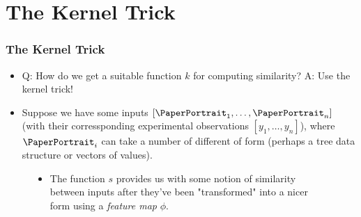 \documentclass[9pt,hyperref={pdfpagelabels=false},xcolor=table]{beamer}
\begin{document}
\section{The Kernel Trick}

\begin{frame}
    \frametitle{The Kernel Trick}
    \begin{itemize}
        \item Q: How do we get a suitable function $k$ for computing similarity? A: Use the kernel trick!
        \item Suppose we have some inputs $\left[ \text{\PaperPortrait}_1 , \ldots , \text{\PaperPortrait}_n \right]$ (with their corressponding experimental observations $\left[ y_1 , \ldots , y_n \right]$), where $\text{\PaperPortrait}_i$ can take a number of different of form (perhaps a tree data structure or vectors of values).
    \end{itemize}
    \begin{figure}[h]
        \centering
        \begin{itemize}
            \item The function $s$ provides us with some notion of similarity between inputs after they've been "transformed" into a nicer form using a {\it feature map} $\phi$.
        \end{itemize}
    \end{figure}
\end{frame}
\end{document}
